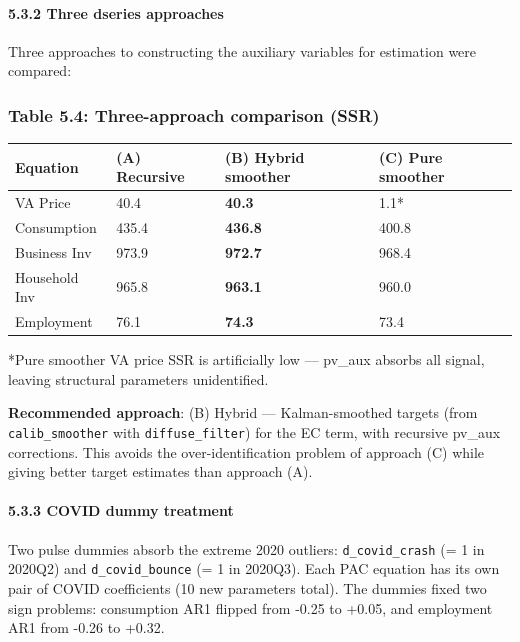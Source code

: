 \documentclass[
]{article}
\newcounter{none} %
\begin{document}
\paragraph{5.3.2 Three dseries
approaches}\label{three-dseries-approaches}

Three approaches to constructing the auxiliary variables for estimation
were compared:

\subsubsection{Table 5.4: Three-approach comparison
(SSR)}\label{table-5.4-three-approach-comparison-ssr}

{\def\LTcaptype{none} %
\begin{longtable}[]{@{}llll@{}}
\toprule\noalign{}
Equation & (A) Recursive & (B) Hybrid smoother & (C) Pure smoother \\
\midrule\noalign{}
\endhead
\bottomrule\noalign{}
\endlastfoot
VA Price & 40.4 & \textbf{40.3} & 1.1* \\
Consumption & 435.4 & \textbf{436.8} & 400.8 \\
Business Inv & 973.9 & \textbf{972.7} & 968.4 \\
Household Inv & 965.8 & \textbf{963.1} & 960.0 \\
Employment & 76.1 & \textbf{74.3} & 73.4 \\
\end{longtable}
}

*Pure smoother VA price SSR is artificially low --- pv\_aux absorbs all
signal, leaving structural parameters unidentified.

\textbf{Recommended approach}: (B) Hybrid --- Kalman-smoothed targets
(from \texttt{calib\_smoother} with \texttt{diffuse\_filter}) for the EC
term, with recursive pv\_aux corrections. This avoids the
over-identification problem of approach (C) while giving better target
estimates than approach (A).

\paragraph{5.3.3 COVID dummy treatment}\label{covid-dummy-treatment}

Two pulse dummies absorb the extreme 2020 outliers:
\texttt{d\_covid\_crash} (= 1 in 2020Q2) and \texttt{d\_covid\_bounce}
(= 1 in 2020Q3). Each PAC equation has its own pair of COVID
coefficients (10 new parameters total). The dummies fixed two sign
problems: consumption AR1 flipped from -0.25 to +0.05, and employment
AR1 from -0.26 to +0.32.
\end{document}
